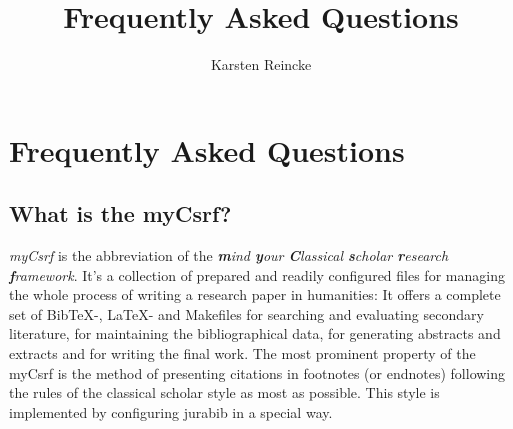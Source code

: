 \documentclass[DIV=calc,BCOR=5mm,11pt,headings=small,oneside,abstract=true, toc=bib]{scrartcl}
\begin{document}

\titlehead{myCsrf-: the Classical Scholar Research Framework}
\subject{Humanities Made With \textit{LaTeX}, \textit{BibTeX} and
\textit{jurabib}}
\title{Frequently Asked Questions}
\author{Karsten Reincke}

\maketitle
\nocite{*}

\footnotesize
\tableofcontents

\normalsize

\section{Frequently Asked Questions }
\subsection{What is the myCsrf?}
\emph{myCsrf} is the abbreviation of the \textit{\textbf{m}ind \textbf{y}our
\textbf{C}lassical \textbf{s}cholar \textbf{r}esearch \textbf{f}ramework}. It's
a collection of prepared and readily configured files for managing the whole
process of writing a research paper in humanities: It offers a complete set of
BibTeX-, LaTeX- and Makefiles for searching and evaluating secondary literature,
for maintaining the bibliographical data, for generating abstracts and extracts
and for writing the final work. The most prominent property of the
myCsrf is the method of presenting citations in footnotes (or
endnotes) following the rules of the classical scholar style as most as
possible. This style is implemented by configuring jurabib in a special way.
\end{document}
